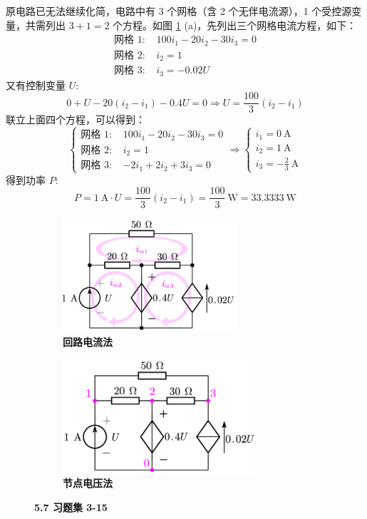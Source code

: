 \documentclass[UTF8]{report}
\theoremstyle{MyLineTheoremStyle} %
\theoremstyle{MyBlockTheoremStyle} %
\theoremstyle{MySubsubsectionStyle} %
\begin{document}
原电路已无法继续化简，电路中有 3 个网格（含 2 个无伴电流源），1 个受控源变量，共需列出 $3 + 1 = 2$ 个方程。如图 \ref{5.7 习题集 3-15} (a)，先列出三个网格电流方程，如下：
\begin{align}
    \text{网格 1: } & 100 i_1 - 20i_2 - 30i_3 = 0 \\ 
    \text{网格 2: } & i_2 = 1 \\ 
    \text{网格 3: } & i_3 = -0.02 U
\end{align}
又有控制变量 $U$: 
\begin{equation}
0 + U - 20(i_2 - i_1) - 0.4 U = 0 \Longrightarrow U = \frac{100}{3}(i_2 - i_1)
\end{equation}
联立上面四个方程，可以得到：
\begin{equation}
\begin{cases}
    \text{网格 1: } & 100 i_1 - 20i_2 - 30i_3 = 0 \\ 
    \text{网格 2: } & i_2 = 1 \\ 
    \text{网格 3: } & -2 i_1 + 2i_2 +3 i_3 = 0
\end{cases}
\Longrightarrow 
\begin{cases}
    i_1 = 0 \ \mathrm{A} \\ 
    i_2 = 1 \ \mathrm{A} \\ 
    i_3 = -\frac{2}{3} \ \mathrm{A}
\end{cases}
\end{equation}
得到功率 $P$:
\begin{equation}
    P = 1 \ \mathrm{A}\cdot U = \frac{100}{3}(i_2 - i_1) = \frac{100}{3} \ \mathrm{W} = 33.3333 \ \mathrm{W}
\end{equation}

\begin{figure}[H]\centering
\begin{subfigure}[t]{0.5\columnwidth}\centering
    \includegraphics[height=120pt]{assets/5/5.7 (1).png}
    \caption{\bfseries 回路电流法 }
\end{subfigure}\hfill
\begin{subfigure}[t]{0.5\columnwidth}\centering
    \includegraphics[height=120pt]{assets/5/5.7 (2).png}
    \caption{\bfseries 节点电压法 }
\end{subfigure}
\caption{\bfseries 5.7 习题集 3-15 }\label{5.7 习题集 3-15}
\end{figure}
\end{document}

